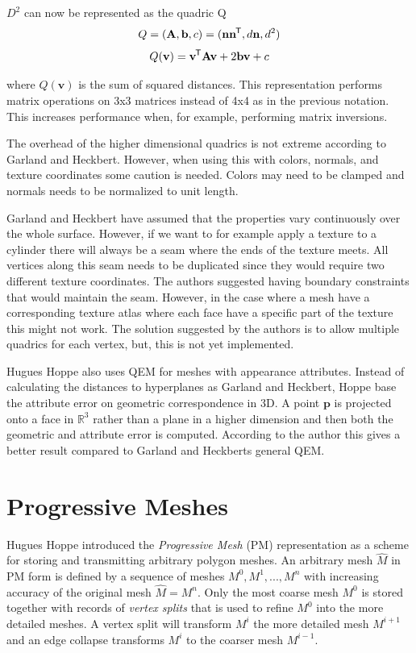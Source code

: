 $D^2$ can now be represented as the quadric Q
\begin{equation}
  Q = (\mathbf{A}, \mathbf{b}, c) = (\mathbf{nn}^{\mkern-1.5mu\mathsf{T}}, d\mathbf{n}, d^2)
\end{equation}
\begin{equation}
  Q(\mathbf{v}) = \mathbf{v}^{\mkern-1.5mu\mathsf{T}}\mathbf{Av} + 2\mathbf{bv} + c
\end{equation}


where \(Q(\mathbf{v})\) is the sum of squared distances. This representation performs matrix operations on 3x3 matrices instead of 4x4 as in the previous notation. This increases performance when, for example, performing matrix inversions.

The overhead of the higher dimensional quadrics is not extreme according to Garland and Heckbert. However, when using this with colors, normals, and texture coordinates some caution is needed. Colors may need to be clamped and normals needs to be normalized to unit length.

Garland and Heckbert have assumed that the properties vary continuously over the whole surface. However, if we want to for example apply a texture to a cylinder there will always be a seam where the ends of the texture meets. All vertices along this seam needs to be duplicated since they would require two different texture coordinates. The authors suggested having boundary constraints that would maintain the seam. However, in the case where a mesh have a corresponding texture atlas where each face have a specific part of the texture this might not work. The solution suggested by the authors is to allow multiple quadrics for each vertex, but, this is not yet implemented.

Hugues Hoppe \cite{Hoppe:1999:NQM:319351.319357} also uses QEM for meshes with appearance attributes. Instead of calculating the distances to hyperplanes as Garland and Heckbert, Hoppe base the attribute error on geometric correspondence in 3D. A point \(\mathbf{p}\) is projected onto a face in \(\mathbb{R}^3\) rather than a plane in a higher dimension and then both the geometric and attribute error is computed. According to the author this gives a better result compared to Garland and Heckberts general QEM.

\section{Progressive Meshes} \label{sec:progressive_meshes}
Hugues Hoppe \cite{hoppe1996progressive} introduced the \emph{Progressive Mesh} (PM) representation as a scheme for storing and transmitting arbitrary polygon meshes. An arbitrary mesh $\hat{M}$ in PM form is defined by a sequence of meshes $M^0, M^1, ..., M^n$ with increasing accuracy of the original mesh $\hat{M} = M^n$. Only the most coarse mesh $M^0$ is stored together with records of \emph{vertex splits} that is used to refine $M^0$ into the more detailed meshes. A vertex split will transform $M^i$ the more detailed mesh $M^{i+1}$ and an edge collapse transforms $M^i$ to the coarser mesh $M^{i-1}$.

